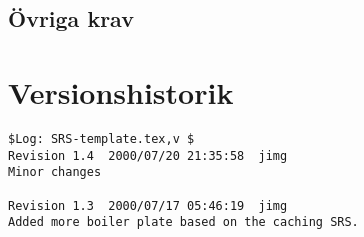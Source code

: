 \documentclass{article}
\begin{document}
\subsection{Övriga krav}

\appendix


\section{Versionshistorik}

\begin{verbatim}
$Log: SRS-template.tex,v $
Revision 1.4  2000/07/20 21:35:58  jimg
Minor changes

Revision 1.3  2000/07/17 05:46:19  jimg
Added more boiler plate based on the caching SRS.

\end{verbatim}


\raggedright


\end{document}
